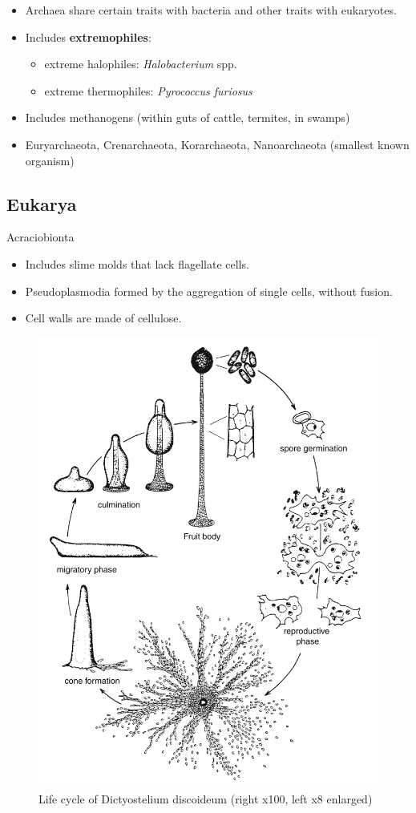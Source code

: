 \documentclass[ignorenonframetext,aspectratio=169]{beamer}
\providecommand{\tightlist}{%
  \setlength{\itemsep}{0pt}\setlength{\parskip}{0pt}}
\begin{document}
\begin{frame}{}
\protect\hypertarget{section-10}{}

\begin{itemize}
\tightlist
\item
  Archaea share certain traits with bacteria and other traits with
  eukaryotes.
\item
  Includes \textbf{extremophiles}:

  \begin{itemize}
  \tightlist
  \item
    extreme halophiles: \emph{Halobacterium} spp.
  \item
    extreme thermophiles: \emph{Pyrococcus furiosus}
  \end{itemize}
\item
  Includes methanogens (within guts of cattle, termites, in swamps)
\item
  Euryarchaeota, Crenarchaeota, Korarchaeota, Nanoarchaeota (smallest
  known organism)
\end{itemize}

\end{frame}

\hypertarget{eukarya}{%
\subsection{Eukarya}\label{eukarya}}

\begin{frame}{Acraciobionta}
\protect\hypertarget{acraciobionta}{}

\begin{itemize}
\tightlist
\item
  Includes slime molds that lack flagellate cells.
\item
  Pseudoplasmodia formed by the aggregation of single cells, without
  fusion.
\item
  Cell walls are made of cellulose.
\end{itemize}

\end{frame}

\begin{frame}{}
\protect\hypertarget{section-11}{}

\begin{figure}
\includegraphics[width=0.35\linewidth]{./../images/acraciobionta_dictyostelium} \caption{Life cycle of Dictyostelium discoideum (right x100, left x8 enlarged)}\label{fig:acraciobionta-dictyostelium}
\end{figure}

\end{frame}
\end{document}
